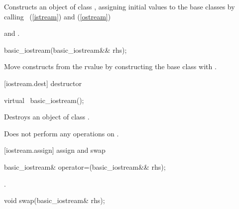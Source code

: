 \begin{itemdescr}
\pnum
\effects
Constructs an object of class
,
assigning initial values to the base classes by calling
~(\ref{istream})
and
 (\ref{ostream})

\pnum
\postcondition
{}
and
.
%
\end{itemdescr}

%
\begin{itemdecl}
basic_iostream(basic_iostream&& rhs);
\end{itemdecl}

\begin{itemdescr}
\pnum
\effects Move constructs from the rvalue  by
constructing the  base class with
.
\end{itemdescr}

[iostream.dest]{ destructor}

%
\begin{itemdecl}
virtual ~basic_iostream();
\end{itemdecl}

\begin{itemdescr}
\pnum
\effects
Destroys an object of class
.

\pnum
\notes
Does not perform any operations on
.
\end{itemdescr}

[iostream.assign]{ assign and swap}

%
%
\begin{itemdecl}
basic_iostream& operator=(basic_iostream&& rhs);
\end{itemdecl}

\begin{itemdescr}
\pnum
\effects {}.
\end{itemdescr}

%
%
\begin{itemdecl}
void swap(basic_iostream& rhs);
\end{itemdecl}

